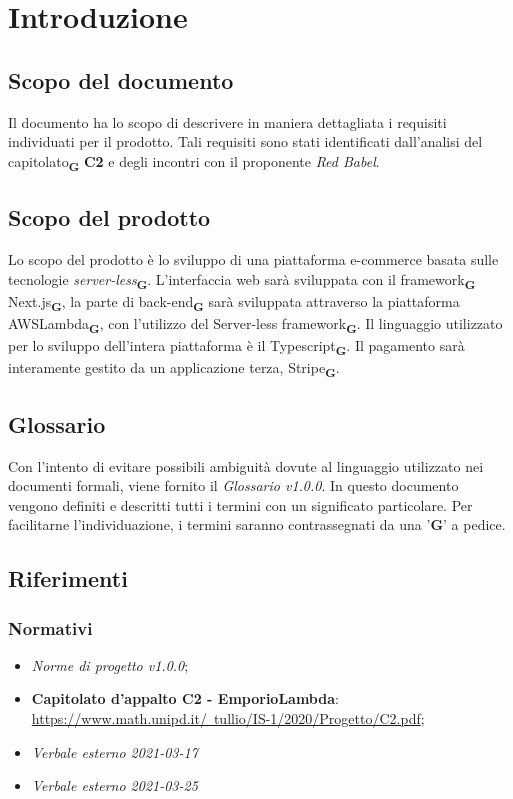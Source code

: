 \section{Introduzione}
    \subsection{Scopo del documento}
    Il documento ha lo scopo di descrivere in maniera dettagliata i requisiti individuati per il prodotto. Tali requisiti sono stati identificati dall'analisi del capitolato\textsubscript{\textbf{G}} \textbf{C2} e degli incontri con il proponente \textit{Red Babel}.
    \subsection{Scopo del prodotto}
    Lo scopo del prodotto è lo sviluppo di una piattaforma e-commerce basata sulle tecnologie \textit{server-less}\textsubscript{\textbf{G}}. L'interfaccia web sarà sviluppata con il framework\textsubscript{\textbf{G}} Next.js\textsubscript{\textbf{G}}, la parte di back-end\textsubscript{\textbf{G}} sarà sviluppata attraverso la piattaforma AWSLambda\textsubscript{\textbf{G}}, con l'utilizzo del Server-less framework\textsubscript{\textbf{G}}. Il linguaggio utilizzato per lo sviluppo dell'intera piattaforma è il Typescript\textsubscript{\textbf{G}}. Il pagamento sarà interamente gestito da un applicazione terza, Stripe\textsubscript{\textbf{G}}.
    \subsection{Glossario}
    Con l'intento di evitare possibili ambiguità dovute al linguaggio utilizzato nei documenti formali, viene fornito il \textit{Glossario v1.0.0}. In questo documento vengono definiti e descritti tutti i termini con un significato particolare. Per facilitarne l'individuazione, i termini saranno contrassegnati da una '\textbf{G}' a pedice.
    \subsection{Riferimenti}
    \subsubsection{Normativi}
    \begin{itemize}
        \item \textit{Norme di progetto v1.0.0};
        \item \textbf{Capitolato d'appalto C2 - EmporioLambda}:\\ \href{https://www.math.unipd.it/~tullio/IS-1/2020/Progetto/C2.pdf}{https://www.math.unipd.it/~tullio/IS-1/2020/Progetto/C2.pdf};
        \item \textit{Verbale esterno 2021-03-17}
        \item \textit{Verbale esterno 2021-03-25}
    \end{itemize}

